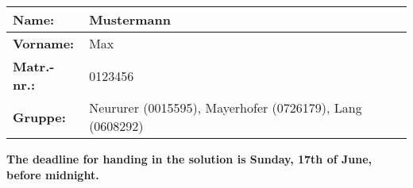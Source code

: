 \documentclass[12pt,a4paper]{uebung}
\begin{document}
\newcommand{\Vorlesung}{Formal Methods in Computer Science}
\newcommand{\Semester}{SS 2012}
\newcommand{\Prof}{Univ.~Prof.~Helmut Veith}
\newcommand{\AssisA}{Dr. Igor Konnov}
\newcommand{\AssisB}{Dr. Florian Zuleger}
\newcommand{\AssisC}{Andreas Holzer, M.Sc.}
\newcommand{\AssisD}{Moritz Sinn, M.Sc.}

\newcommand{\solution}[1]{}

\newcommand\ltlX{\textsf{\textbf{X}}\,}
\newcommand\ltlF{\textsf{\textbf{F}}\,}
\newcommand\ltlG{\textsf{\textbf{G}}\,}
\newcommand\ltlU{\,\textsf{\textbf{U}}\,}
\newcommand\ILTLX[0]{$\mbox{\textsf{ILTL}}_{\mbox{\textsf{-X}}}$}
\newcommand\LTLX[0]{$\mbox{\textsf{LTL}}_{\mbox{\textsf{-X}}}$}




\setlength{\unitlength}{1mm}

\begin{tabularx}{\textwidth}{|l|X|}
\hline
\textbf{Name:}& Mustermann \\\hline
\textbf{Vorname:}& Max\\\hline
\textbf{Matr.-nr.:}& 0123456 \\\hline
\textbf{Gruppe:}& Neururer (0015595), Mayerhofer (0726179), Lang (0608292)  \\\hline
\end{tabularx}



\begin{center}
\textbf{The deadline for handing in the solution is Sunday, 17th of June, before midnight.}
\end{center}


\newpage

\newpage

\newpage

\newpage

\newpage

\newpage

\newpage
\end{document}
